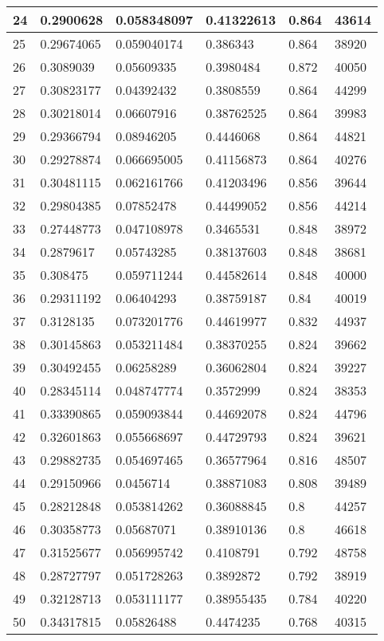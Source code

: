 \begin{longtable}{|l|l|l|l|l|l|}
24 & 0.2900628 & 0.058348097 & 0.41322613 & 0.864 & 43614 \\ \hline 
25 & 0.29674065 & 0.059040174 & 0.386343 & 0.864 & 38920 \\ \hline 
26 & 0.3089039 & 0.05609335 & 0.3980484 & 0.872 & 40050 \\ \hline 
27 & 0.30823177 & 0.04392432 & 0.3808559 & 0.864 & 44299 \\ \hline 
28 & 0.30218014 & 0.06607916 & 0.38762525 & 0.864 & 39983 \\ \hline 
29 & 0.29366794 & 0.08946205 & 0.4446068 & 0.864 & 44821 \\ \hline 
30 & 0.29278874 & 0.066695005 & 0.41156873 & 0.864 & 40276 \\ \hline 
31 & 0.30481115 & 0.062161766 & 0.41203496 & 0.856 & 39644 \\ \hline 
32 & 0.29804385 & 0.07852478 & 0.44499052 & 0.856 & 44214 \\ \hline 
33 & 0.27448773 & 0.047108978 & 0.3465531 & 0.848 & 38972 \\ \hline 
34 & 0.2879617 & 0.05743285 & 0.38137603 & 0.848 & 38681 \\ \hline 
35 & 0.308475 & 0.059711244 & 0.44582614 & 0.848 & 40000 \\ \hline 
36 & 0.29311192 & 0.06404293 & 0.38759187 & 0.84 & 40019 \\ \hline 
37 & 0.3128135 & 0.073201776 & 0.44619977 & 0.832 & 44937 \\ \hline 
38 & 0.30145863 & 0.053211484 & 0.38370255 & 0.824 & 39662 \\ \hline 
39 & 0.30492455 & 0.06258289 & 0.36062804 & 0.824 & 39227 \\ \hline 
40 & 0.28345114 & 0.048747774 & 0.3572999 & 0.824 & 38353 \\ \hline 
41 & 0.33390865 & 0.059093844 & 0.44692078 & 0.824 & 44796 \\ \hline 
42 & 0.32601863 & 0.055668697 & 0.44729793 & 0.824 & 39621 \\ \hline 
43 & 0.29882735 & 0.054697465 & 0.36577964 & 0.816 & 48507 \\ \hline 
44 & 0.29150966 & 0.0456714 & 0.38871083 & 0.808 & 39489 \\ \hline 
45 & 0.28212848 & 0.053814262 & 0.36088845 & 0.8 & 44257 \\ \hline 
46 & 0.30358773 & 0.05687071 & 0.38910136 & 0.8 & 46618 \\ \hline 
47 & 0.31525677 & 0.056995742 & 0.4108791 & 0.792 & 48758 \\ \hline 
48 & 0.28727797 & 0.051728263 & 0.3892872 & 0.792 & 38919 \\ \hline 
49 & 0.32128713 & 0.053111177 & 0.38955435 & 0.784 & 40220 \\ \hline 
50 & 0.34317815 & 0.05826488 & 0.4474235 & 0.768 & 40315 \\ \hline 
\end{longtable}